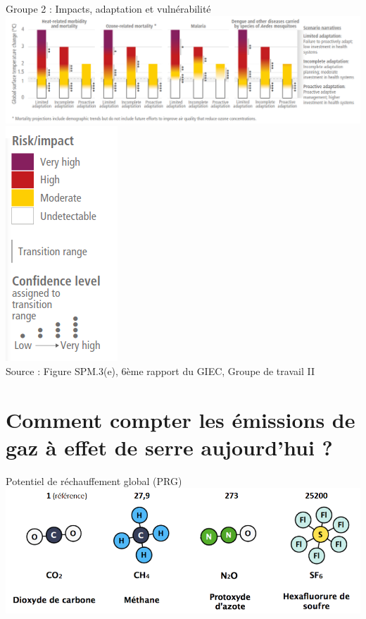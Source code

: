 \documentclass{beamer}
\begin{document}
\begin{frame}{Groupe 2 : Impacts, adaptation et vulnérabilité}
\centering
\includegraphics[scale=0.24]{images/Health_adaptation.png}
\includegraphics[scale=0.24]{images/Legend_impact_adaptation.png}
\\
\tiny{Source : Figure SPM.3(e), 
 6ème rapport du GIEC, Groupe de travail II}
\end{frame}

\section{Comment compter les émissions de gaz à effet de serre aujourd'hui ?}

\begin{frame}{Potentiel de réchauffement global (PRG)}
\centering
\includegraphics[scale=0.35]{images/PRG.png}
\end{frame}
\end{document}
